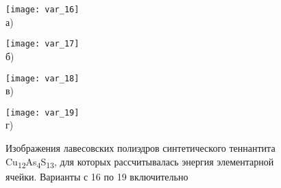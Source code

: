 \begin{figure}[p!]
  \begin{minipage}[ht]{0.45\linewidth}\centering
    \texttt{[image: var\_16]} \\ а)
  \end{minipage}
						\hfill
 \begin{minipage}[ht]{0.45\linewidth}\centering
    \texttt{[image: var\_17]} \\ б)
  \end{minipage}
\vfill

  \begin{minipage}[ht]{0.45\linewidth}\centering
    \texttt{[image: var\_18]} \\ в)
  \end{minipage}
						\hfill
 \begin{minipage}[ht]{0.45\linewidth}\centering
    \texttt{[image: var\_19]} \\ г)
  \end{minipage}
\vfill

  \begin{minipage}[ht]{0.45\linewidth}\centering
    
  \end{minipage}
						\hfill
 \begin{minipage}[ht]{0.45\linewidth}\centering
   
  \end{minipage}
      \caption[Изображения лавесовских полиэдров синтетического теннантита Cu\textsubscript{12}As\textsubscript{4}S\textsubscript{13}, для которых рассчитывалась энергия элементарной ячейки. Варианты с 16 по 19 включительно]{Изображения лавесовских полиэдров синтетического теннантита Cu\textsubscript{12}As\textsubscript{4}S\textsubscript{13}, для которых рассчитывалась энергия элементарной ячейки. Варианты с 16 по 19 включительно}
    \label{img:laves4}
\end{figure}



\newpage

\clearpage